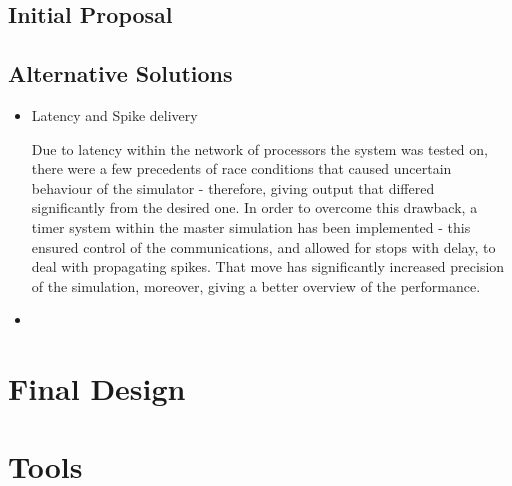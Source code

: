 \subsection{Initial Proposal}

\subsection{Alternative Solutions}
\begin{itemize}

\item {Latency and Spike delivery}

Due to latency within the network of processors the system was tested on, there were a few precedents of race conditions that caused uncertain behaviour of the simulator - therefore, giving output that differed significantly from the desired one. In order to overcome this drawback, a timer system within the master simulation has been implemented - this ensured control of the communications, and allowed for stops with delay, to deal with propagating spikes. That move has significantly increased precision of the simulation, moreover, giving a better overview of the performance.

\item {}

\end{itemize}


\section{Final Design}

\section{Tools}
